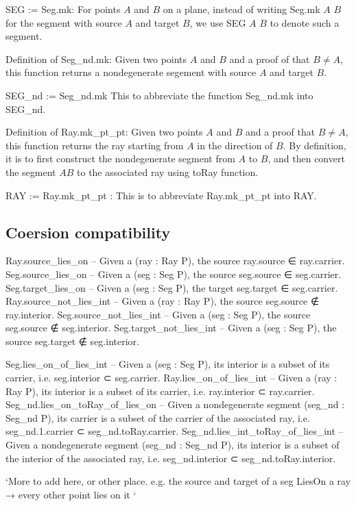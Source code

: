 \documentclass[12pt,a4paper]{article}
\begin{document}
SEG := Seg.mk: For points $A$ and $B$ on a plane, instead of writing Seg.mk $A$ $B$ for the segment with source $A$ and target $B$, we use SEG $A$ $B$ to denote such a segment.

Definition of Seg_nd.mk: Given two points $A$ and $B$ and a proof of that $B \neq A$, this function returns a nondegenerate segement with source $A$ and target $B$.

SEG_nd := Seg_nd.mk This to abbreviate the function Seg_nd.mk into SEG_nd.

Definition of Ray.mk_pt_pt: Given two points $A$ and $B$ and a proof that $B \neq A$, this function returns the ray starting from $A$ in the direction of $B$. By definition, it is to first construct the nondegenerate segment from $A$ to $B$, and then convert the segment $AB$ to the associated ray using toRay function.

RAY := Ray.mk_pt_pt : This is to abbreviate Ray.mk_pt_pt into RAY.

\subsection{Coersion compatibility}

    Ray.source_lies_on -- Given a (ray : Ray P), the source ray.source ∈ ray.carrier.
    Seg.source_lies_on -- Given a (seg : Seg P), the source seg.source ∈ seg.carrier.
    Seg.target_lies_on -- Given a (seg : Seg P), the target seg.target ∈ seg.carrier.
    Ray.source_not_lies_int -- Given a (ray : Ray P), the source seg.source ∉ ray.interior.
    Seg.source_not_lies_int -- Given a (seg : Seg P), the source seg.source ∉ seg.interior.
    Seg.target_not_lies_int -- Given a (seg : Seg P), the source seg.target ∉ seg.interior.

    Seg.lies_on_of_lies_int -- Given a (seg : Seg P), its interior is a subset of its carrier, i.e. seg.interior ⊂ seg.carrier.
    Ray.lies_on_of_lies_int -- Given a (ray : Ray P), its interior is a subset of its carrier, i.e. ray.interior ⊂ ray.carrier.
    Seg_nd.lies_on_toRay_of_lies_on -- Given a nondegenerate segment (seg_nd : Seg_nd P), its carrier is a subset of the carrier of the associated ray, i.e. seg_nd.1.carrier ⊂ seg_nd.toRay.carrier.
    Seg_nd.lies_int_toRay_of_lies_int -- Given a nondegenerate segment (seg_nd : Seg_nd P), its interior is a subset of the interior of the associated ray, i.e. seg_nd.interior ⊂ seg_nd.toRay.interior.

    `More to add here, or other place. e.g. the source and target of a seg LiesOn a ray → every other point lies on it `
\end{document}
